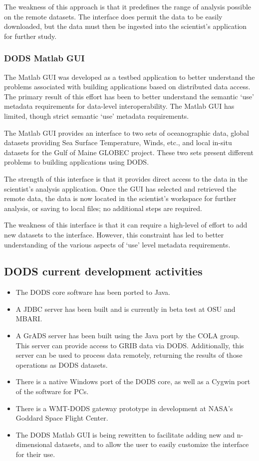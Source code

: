 The weakness of this approach is that it predefines the range of analysis possible on the remote 
datasets. The interface does permit the data to be easily downloaded, but the data must then be 
ingested into the scientist's application for further study.

\subsubsection{DODS Matlab GUI}

The Matlab GUI was developed as a testbed application to better understand the problems 
associated with building applications based on distributed data access. The primary result of this 
effort has been to better understand the semantic `use' metadata requirements for data-level 
interoperability. The Matlab GUI has limited, though strict semantic `use' metadata requirements.

The Matlab GUI provides an interface to two sets of oceanographic data, global datasets 
providing Sea Surface Temperature, Winds, etc., and local in-situ datasets for the Gulf of Maine 
GLOBEC project. These two sets present different problems to building applications using 
DODS.

The strength of this interface is that it provides direct access to the data in the scientist's analysis 
application. Once the GUI has selected and retrieved the remote data, the data is now located in 
the scientist's workspace for further analysis, or saving to local files; no additional steps are 
required.

The weakness of this interface is that it can require a high-level of effort to add new datasets to 
the interface. However, this constraint has led to better understanding of the various aspects of 
`use' level metadata requirements.

\subsection{DODS current development activities}

\begin{itemize}
\item  The DODS core software has been ported to Java.
\item A JDBC server has been built and is currently in beta test at OSU and MBARI.
\item A GrADS server has been built using the Java port by the COLA group. This server can 
provide access to GRIB data via DODS. Additionally, this server can be used to process data 
remotely, returning the results of those operations as DODS datasets.
\item There is a native Windows port of the DODS core, as well as a Cygwin port of the software 
for PCs.
\item There is a WMT-DODS gateway prototype in development at NASA's Goddard Space Flight 
Center.
\item The DODS Matlab GUI is being rewritten to facilitate adding new and n-dimensional 
datasets, and to allow the user to easily customize the interface for their use. 
\end{itemize}

